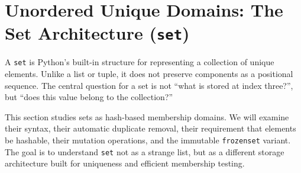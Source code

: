 \section{Unordered Unique Domains: The Set Architecture (\texttt{set})}

A \texttt{set} is Python's built-in structure for representing a collection of unique elements. Unlike a list or tuple, it does not preserve components as a positional sequence. The central question for a set is not ``what is stored at index three?'', but ``does this value belong to the collection?''

This section studies sets as hash-based membership domains. We will examine their syntax, their automatic duplicate removal, their requirement that elements be hashable, their mutation operations, and the immutable \texttt{frozenset} variant. The goal is to understand \texttt{set} not as a strange list, but as a different storage architecture built for uniqueness and efficient membership testing.